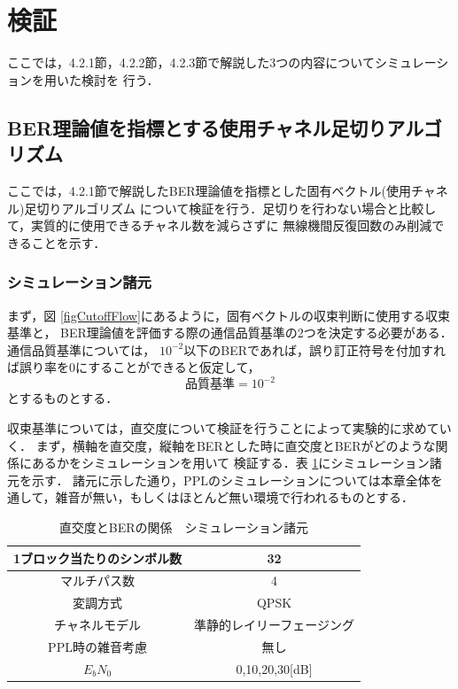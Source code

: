 \section{検証}
ここでは，4.2.1節，4.2.2節，4.2.3節で解説した3つの内容についてシミュレーションを用いた検討を
行う．

\subsection{BER理論値を指標とする使用チャネル足切りアルゴリズム}
ここでは，4.2.1節で解説したBER理論値を指標とした固有ベクトル(使用チャネル)足切りアルゴリズム
について検証を行う．足切りを行わない場合と比較して，実質的に使用できるチャネル数を減らさずに
無線機間反復回数のみ削減できることを示す．

\subsubsection{シミュレーション諸元}
まず，図 \ref{figCutoffFlow}にあるように，固有ベクトルの収束判断に使用する収束基準と，
BER理論値を評価する際の通信品質基準の2つを決定する必要がある．通信品質基準については，
$10^{-2}$以下のBERであれば，誤り訂正符号を付加すれば誤り率を0にすることができると仮定して，
\begin{equation}
    品質基準=10^{-2}
\end{equation}
とするものとする．

収束基準については，直交度について検証を行うことによって実験的に求めていく．
まず，横軸を直交度，縦軸をBERとした時に直交度とBERがどのような関係にあるかをシミュレーションを用いて
検証する．表 \ref{tabCutoff1}にシミュレーション諸元を示す．
諸元に示した通り，PPLのシミュレーションについては本章全体を通して，雑音が無い，もしくはほとんど無い環境で行われるものとする．

\begin{table}[ht]
    \begin{tabular}{|c|c|} \hline
        1ブロック当たりのシンボル数 & 32 \\ \hline
        マルチパス数 & 4 \\ \hline
        変調方式 & QPSK \\ \hline
        チャネルモデル & 準静的レイリーフェージング \\ \hline
        PPL時の雑音考慮 & 無し \\ \hline
        $E_bN_0$ & 0,10,20,30[dB] \\ \hline
    \end{tabular}
    \centering
    \caption{直交度とBERの関係　シミュレーション諸元}
    \label{tabCutoff1}
\end{table}

